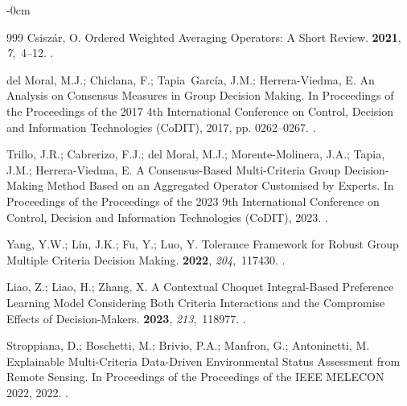 \documentclass[mathematics,article,submit,moreauthors]{Definitions/mdpi}
\begin{document}
\begin{adjustwidth}{-\extralength}{0cm}
\begin{thebibliography}{999}
Csisz{\'a}r, O.
\newblock Ordered Weighted Averaging Operators: A Short Review.
 {\bf 2021}, {\em 7},~4--12.
.

del Moral, M.J.; Chiclana, F.; Tapia~Garc{\'i}a, J.M.; Herrera-Viedma, E.
\newblock An Analysis on Consensus Measures in Group Decision Making.
\newblock In Proceedings of the Proceedings of the 2017 4th International Conference on Control, Decision and Information Technologies (CoDIT),  2017, pp. 0262--0267.
.

Trillo, J.R.; Cabrerizo, F.J.; del Moral, M.J.; Morente-Molinera, J.A.; Tapia, J.M.; Herrera-Viedma, E.
\newblock A Consensus-Based Multi-Criteria Group Decision-Making Method Based on an Aggregated Operator Customised by Experts.
\newblock In Proceedings of the Proceedings of the 2023 9th International Conference on Control, Decision and Information Technologies (CoDIT),  2023.
.

Yang, Y.W.; Lin, J.K.; Fu, Y.; Luo, Y.
\newblock Tolerance Framework for Robust Group Multiple Criteria Decision Making.
 {\bf 2022}, {\em 204},~117430.
.

Liao, Z.; Liao, H.; Zhang, X.
\newblock A Contextual {Choquet} Integral-Based Preference Learning Model Considering Both Criteria Interactions and the Compromise Effects of Decision-Makers.
 {\bf 2023}, {\em 213},~118977.
.

Stroppiana, D.; Boschetti, M.; Brivio, P.A.; Manfron, G.; Antoninetti, M.
\newblock Explainable Multi-Criteria Data-Driven Environmental Status Assessment from Remote Sensing.
\newblock In Proceedings of the Proceedings of the IEEE MELECON 2022,  2022.
.


\end{thebibliography}
\end{adjustwidth}
\end{document}
